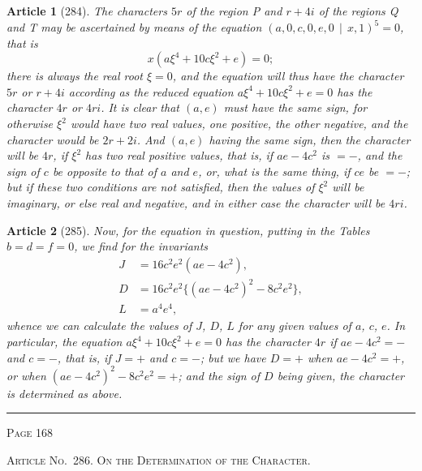 \documentclass[11pt,a4paper]{article}
\theoremstyle{cayley}
\newtheorem{art}{Article}
\begin{document}
\begin{art}[284]
The characters $5r$ of the region P and $r+4i$ of the regions Q and T may be ascertained by means of the equation $(a, 0, c, 0, e, 0 \,\mid\, x, 1)^5 = 0$, that is
\[
x(a\xi^4 + 10c\xi^2 + e) = 0;
\]
there is always the real root $\xi=0$, and the equation will thus have the character $5r$ or $r+4i$ according as the reduced equation $a\xi^4 + 10c\xi^2 + e = 0$ has the character $4r$ or $4ri$. It is clear that $(a, e)$ must have the same sign, for otherwise $\xi^2$ would have two real values, one positive, the other negative, and the character would be $2r+2i$. And $(a, e)$ having the same sign, then the character will be $4r$, if $\xi^2$ has two real positive values, that is, if $ae - 4c^2$ is $=-$, and the sign of $c$ be opposite to that of $a$ and $e$, or, what is the same thing, if $ce$ be $=-$; but if these two conditions are not satisfied, then the values of $\xi^2$ will be imaginary, or else real and negative, and in either case the character will be $4ri$.
\end{art}

\begin{art}[285]
Now, for the equation in question, putting in the Tables $b=d=f=0$, we find for the invariants
\begin{align*}
J &= 16c^2e^2(ae - 4c^2), \\
D &= 16c^2e^2\{(ae-4c^2)^2 - 8c^2e^2\}, \\
L &= a^4e^4,
\end{align*}
whence we can calculate the values of $J$, $D$, $L$ for any given values of $a$, $c$, $e$. In particular, the equation $a\xi^4 + 10c\xi^2 + e = 0$ has the character $4r$ if $ae - 4c^2 = -$ and $c = -$, that is, if $J = +$ and $c = -$; but we have $D = +$ when $ae - 4c^2 = +$, or when $(ae - 4c^2)^2 - 8c^2e^2 = +$; and the sign of $D$ being given, the character is determined as above.
\end{art}

\vspace{1em}
\noindent\rule{\textwidth}{0.4pt}
\begin{center}\textsc{Page 168}\end{center}
\newpage

\begin{center}
\textsc{Article No.\ 286. On the Determination of the Character.}
\end{center}
\end{document}
